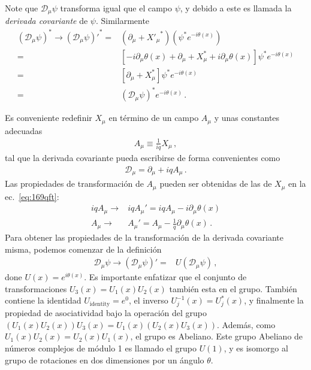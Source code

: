 Note que  $\mathcal{D}_\mu\psi$ transforma igual que el campo $\psi$, y debido a este es llamada la \emph{derivada covariante} de $\psi$.
Similarmente
\begin{align}
    (\mathcal{D}_\mu \psi)^*\to{\left(\mathcal{D}_\mu \psi\right)'}^*=&(\partial_\mu+{X'_\mu}^*) \left(\psi^*e^{-i\theta(x)}\right)\nonumber\\
=&\left[-i\partial_\mu \theta(x)+\partial_\mu+X_\mu^*+i\partial_\mu\theta(x) \right]\psi^*e^{-i\theta(x)}\nonumber\\
=&\left[\partial_\mu+X_\mu^*\right]\psi^*e^{-i\theta(x)}\nonumber\\
=&\left(\mathcal{D}_\mu\psi\right)^*e^{-i\theta(x)}\,.
\end{align}

Es conveniente redefinir $X_\mu$ en término de un campo  $A_\mu$ y unas constantes adecuadas
\begin{align}
  A_\mu\equiv\frac{1}{i q}X_\mu\,,
\end{align}
tal que la derivada covariante pueda escribirse de forma convenientes como
\begin{align}
\label{eq:170qft}
  \mathcal{D}_\mu=\partial_\mu+i q A_\mu\,.
\end{align}
Las propiedades de transformación de  $A_\mu$ pueden ser obtenidas de las de  $X_\mu$ en la ec.~\eqref{eq:169qft}: 
\begin{align}
\label{eq:159qft}
 i q A_\mu\to& i q A_\mu'=i q A_\mu-i \partial_\mu\theta(x)\nonumber\\
  A_\mu\to&  A_\mu'= A_\mu-\frac{1}{q} \partial_\mu\theta(x)\,.
\end{align}
Para obtener las propiedades de la transformación de la derivada covariante misma, podemos comenzar de la definición
\begin{align}
    \mathcal{D}_\mu \psi\to\left(\mathcal{D}_\mu \psi\right)'=&U\left(\mathcal{D}_\mu \psi\right)\,,
\end{align}
done $U(x)=e^{i\theta(x)}$. Es importante enfatizar que el conjunto de transformaciones  $U_3(x)=U_1(x)U_2(x)$ también esta en el grupo. También contiene la identidad
$U_{\text{identity}}=e^{0}$, el inverso $U_{j}^{-1}(x)=U_{j}^{*}(x)$, y finalmente la propiedad de asociatividad bajo la operación del grupo $\left( U_1(x)U_2(x) \right)U_3(x)=U_1(x)\left( U_2(x)U_3(x) \right)$. 
Además, como $U_1(x)U_2(x)=U_2(x)U_1(x)$, el grupo es Abeliano. Este grupo Abeliano de números complejos de módulo 1 es llamado el grupo $U(1)$, 
y es isomorgo al grupo de rotaciones en dos dimensiones por un ángulo  $\theta$. 

